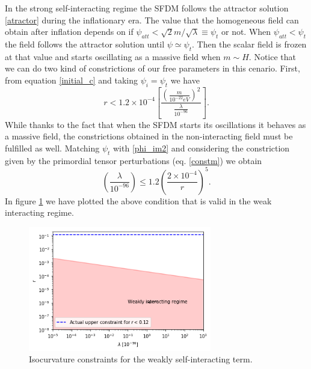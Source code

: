 \documentclass[amssymb,twocolumn,prd,nofootinbib,showpacs]{revtex4-1}
\begin{document}
In the strong self-interacting regime the SFDM follows the attractor solution \eqref{atractor} during the inflationary era.
The value that the homogeneous field can obtain after inflation depends on if $\psi_{att}<\sqrt{2}m/\sqrt{\lambda}\equiv \psi_t$ or not. When $\psi_{att}<\psi_t$ the field follows the attractor solution until $\psi\simeq \psi_t$. Then the scalar field is frozen at that value and starts oscillating as a massive field when $m\sim H$. Notice that we can do two kind of constrictions of our free parameters in this cenario. First, from equation \eqref{initial_c} and taking $\psi_i=\psi_t$ we have
\begin{equation}
r<1.2\times 10^{-4}\left[\frac{\left(\frac{m}{10^{-22}eV}\right)^2}{\frac{\lambda}{10^{-96}}}\right].
\end{equation}
While thanks to the fact that when the SFDM starts its oscillations it behaves as a massive field, the constrictions obtained in the non-interacting field must be fulfilled as well. Matching $\psi_t$ with \eqref{phi_im2} and considering the constriction given by the primordial tensor perturbations (eq. \eqref{constm}) we obtain
\begin{equation}
\left(\frac{\lambda}{10^{-96}}\right)\leq 1.2\left(\frac{2\times 10^{-4}}{r}\right)^5.
\end{equation}
In figure \ref{constraintsSFDMl} we have plotted the above condition that is valid in the weak interacting regime.

\begin{figure}[h]
\includegraphics[width=8cm]{lambdavsr.png}
\caption{Isocurvature constraints for the weakly self-interacting term.}\label{constraintsSFDMl}
\end{figure} 
\end{document}
